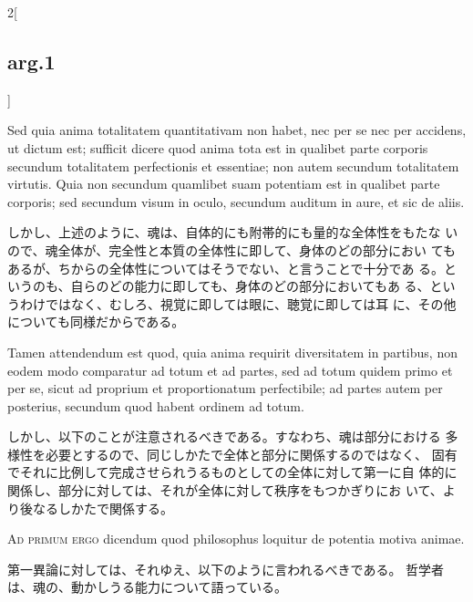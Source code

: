 \documentclass[paper=a4paper,fontsize=10pt,jafontsize=9pt,titlepage]{jlreq}
\begin{document}
\begin{paracol}{2}[\subsection{arg.1}]
\switchcolumn*

 Sed quia anima totalitatem quantitativam non habet, nec per se nec
 per accidens, ut dictum est; sufficit dicere quod anima tota est in
 qualibet parte corporis secundum totalitatem perfectionis et
 essentiae; non autem secundum totalitatem virtutis. Quia non secundum
 quamlibet suam potentiam est in qualibet parte corporis; sed secundum
 visum in oculo, secundum auditum in aure, et sic de aliis.

 \switchcolumn

 しかし、上述のように、魂は、自体的にも附帯的にも量的な全体性をもたな
 いので、魂全体が、完全性と本質の全体性に即して、身体のどの部分におい
 てもあるが、ちからの全体性についてはそうでない、と言うことで十分であ
 る。というのも、自らのどの能力に即しても、身体のどの部分においてもあ
 る、というわけではなく、むしろ、視覚に即しては眼に、聴覚に即しては耳
 に、その他についても同様だからである。

\switchcolumn*

 Tamen attendendum est quod, quia anima requirit diversitatem in
 partibus, non eodem modo comparatur ad totum et ad partes, sed ad
 totum quidem primo et per se, sicut ad proprium et proportionatum
 perfectibile; ad partes autem per posterius, secundum quod habent
 ordinem ad totum.

 \switchcolumn

 しかし、以下のことが注意されるべきである。すなわち、魂は部分における
 多様性を必要とするので、同じしかたで全体と部分に関係するのではなく、
 固有でそれに比例して完成させられうるものとしての全体に対して第一に自
 体的に関係し、部分に対しては、それが全体に対して秩序をもつかぎりにお
 いて、より後なるしかたで関係する。

\switchcolumn*[\subsection{ad 1}]



 {\scshape Ad primum ergo} dicendum quod philosophus loquitur de
 potentia motiva animae.

 \switchcolumn

 第一異論に対しては、それゆえ、以下のように言われるべきである。
 哲学者は、魂の、動かしうる能力について語っている。
 
\switchcolumn*[\subsection{ad 2}]




\end{paracol}
\end{document}
